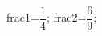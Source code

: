 \documentclass[exercice]{thedocument}%
\begin{document}
%
    \>frac1=$\dfrac14$;%
    \>frac2=$\dfrac69$;%
\end{document}
